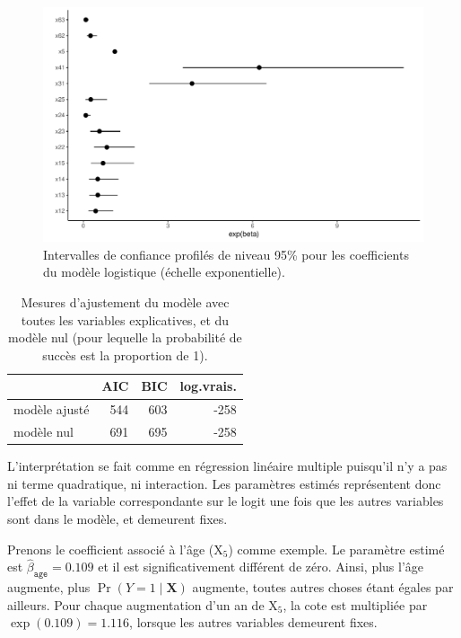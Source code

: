 \documentclass[
  11pt,
  letterpaper,
]{scrbook}
\theoremstyle{definition}
\theoremstyle{remark}
\begin{document}
\begin{figure}[ht!]

{\centering \includegraphics[width=1\textwidth,height=\textheight]{./05-reglogistique_files/figure-pdf/fig-confint-modele2-logist-1.pdf}

}

\caption{\label{fig-confint-modele2-logist}Intervalles de confiance
profilés de niveau 95\% pour les coefficients du modèle logistique
(échelle exponentielle).}

\end{figure}

\hypertarget{tbl-gof-logist1}{}
\begin{table}
\caption{\label{tbl-gof-logist1}Mesures d'ajustement du modèle avec toutes les variables explicatives,
et du modèle nul (pour lequelle la probabilité de succès est la
proportion de 1). }\tabularnewline

\centering
\begin{tabular}{lrrr}
\toprule
  & AIC & BIC & log.vrais.\\
\midrule
modèle ajusté & 544 & 603 & -258\\
modèle nul & 691 & 695 & -258\\
\bottomrule
\end{tabular}
\end{table}

L'interprétation se fait comme en régression linéaire multiple puisqu'il
n'y a pas ni terme quadratique, ni interaction. Les paramètres estimés
représentent donc l'effet de la variable correspondante sur le logit une
fois que les autres variables sont dans le modèle, et demeurent fixes.

Prenons le coefficient associé à l'âge (\(\mathrm{X}_5\)) comme exemple.
Le paramètre estimé est \(\widehat{\beta}_{\texttt{age}}=0.109\) et il
est significativement différent de zéro. Ainsi, plus l'âge augmente,
plus \(\Pr(Y=1\mid \mathbf{X})\) augmente, toutes autres choses étant
égales par ailleurs. Pour chaque augmentation d'un an de
\(\mathrm{X}_5\), la cote est multipliée par \(\exp(0.109)=1.116\),
lorsque les autres variables demeurent fixes.
\end{document}
